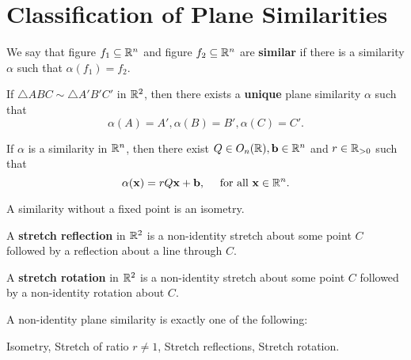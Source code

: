 \section{Classification of Plane Similarities}

\begin{definition}
    We say that figure \(f_1 \subseteq \mathbb{R}^n\) and figure \(f_2 \subseteq \mathbb{R}^n\) are \textbf{similar} if there is a similarity \(\alpha\) such that \(\alpha(f_1) = f_2\).
\end{definition}

\begin{theorem}
    If \(\triangle ABC \sim \triangle A'B'C'\) in \(\mathbb{R}^2\), then there exists a \textbf{unique} plane similarity \(\alpha\) such that
    \[\alpha(A) = A', \alpha(B) = B', \alpha(C) = C'.\]
\end{theorem}

\begin{theorem}
    If \(\alpha\) is a similarity in \(\mathbb{R}^n\), then there exist \(Q \in O_n(\mathbb{R}), \mathbf{b} \in \mathbb{R}^n\) and \(r \in \mathbb{R}_{> 0}\) such that
    \[\alpha(\mathbf{x}) = rQ\mathbf{x} + \mathbf{b}, \quad \text{ for all } \mathbf{x} \in \mathbb{R}^n.\]
\end{theorem}

\begin{lemma}
    A similarity without a fixed point is an isometry.
\end{lemma}

\begin{definition}
    \begin{statements}{}
        \item A \textbf{stretch reflection} in \(\mathbb{R}^2\) is a non-identity stretch about some point \(C\) followed by a reflection about a line through \(C\).
        \item A \textbf{stretch rotation} in \(\mathbb{R}^2\) is a non-identity stretch about some point \(C\) followed by a non-identity rotation about \(C\).
    \end{statements}
\end{definition}

\begin{theorem}
    A non-identity plane similarity is exactly one of the following:
    \begin{center}
        Isometry, \quad Stretch of ratio \(r \neq 1\), \quad Stretch reflections, \quad Stretch rotation.
    \end{center}
\end{theorem}

